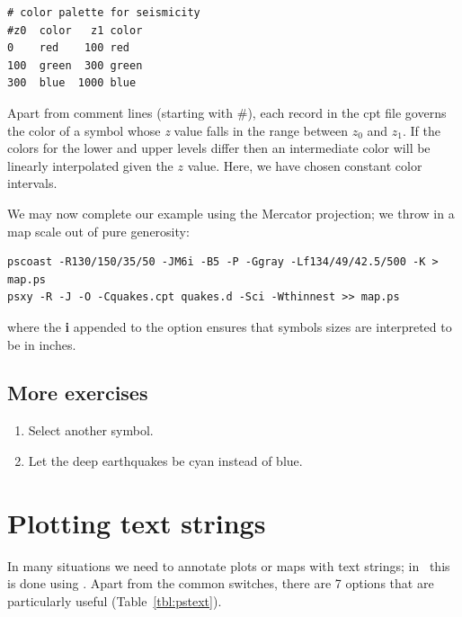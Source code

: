 \documentclass{report}
\begin{document}
{\small\begin{verbatim}
# color palette for seismicity
#z0  color   z1 color
0    red    100 red
100  green  300 green
300  blue  1000 blue
\end{verbatim}
}

Apart from comment lines (starting with \#), each record in the cpt file
governs the color of a symbol whose {\it z} value falls in the range between
$z_0$ and $z_1$.  If the colors for the lower and upper levels differ
then an intermediate color will be linearly interpolated given the $z$
value.  Here, we have chosen constant color intervals.

We may now complete our example using the Mercator projection; we throw in a
map scale out of pure generosity:

{\small\begin{verbatim} 
pscoast -R130/150/35/50 -JM6i -B5 -P -Ggray -Lf134/49/42.5/500 -K > map.ps
psxy -R -J -O -Cquakes.cpt quakes.d -Sci -Wthinnest >> map.ps
\end{verbatim}
}

\noindent
where the {\bf i} appended to the  option ensures that symbols
sizes are interpreted to be in inches.
\subsection{More exercises}

\begin{enumerate}

\item Select another symbol.

\item Let the deep earthquakes be cyan instead of blue.

\end{enumerate}

\section{Plotting text strings}

In many situations we need to annotate plots or maps with text strings;
in \GMT\ this is done using .  Apart from the common
switches, there are 7 options that are particularly useful (Table~\ref{tbl:pstext}).
\end{document}
